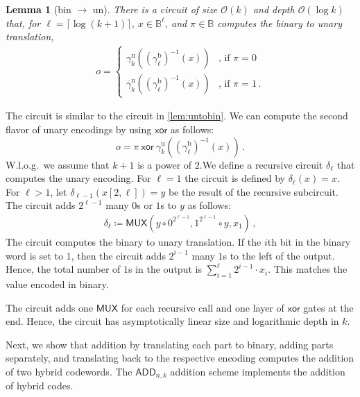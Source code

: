 \documentclass[9pt,journal,compsoc]{IEEEtran}
\newtheorem{lemma}[theorem]{Lemma}
\theoremstyle{remark}
\newcommand{\IB}{\mathbb{B}}
\newcommand{\XOR}{\textsf{xor}}
\newcommand{\MUX}{\textsf{MUX}}
\newcommand{\ceil}[1]{\lceil{#1}\rceil}
\newcommand{\gBin}[1]{\gamma_{#1}^{\operatorname{b}}}
\newcommand{\gUnary}[1]{\gamma_{#1}^{\operatorname{u}}}
\newcommand{\gbUnary}[1]{\overline{\gamma}_{#1}^{\operatorname{u}}}
\newcommand{\BLM}{{\textsf{ADD}}_{n,k}}
\newcommand{\BO}{\mathcal{O}}
\begin{document}
\begin{lemma}[bin $\rightarrow$ un]\label{lem:bintoun}
  There is a circuit of size $\BO(k)$ and depth $\BO(\log k)$ that, 
    for $\ell=\ceil{\log(k+1)}$, $x\in\IB^{\ell}$, and $\pi\in\IB$
    computes the binary to unary translation,
  \begin{align*}
    o =
    \begin{cases}
      \gUnary{k}((\gBin{\ell})^{-1}(x)) & \text{, if } \pi=0 \\
      \gbUnary{k}((\gBin{\ell})^{-1}(x)) & \text{, if } \pi=1\,.
    \end{cases}
  \end{align*}
\end{lemma}
\begin{IEEEproof}
  The circuit is similar to the circuit in \cref{lem:untobin}.
  We can compute the second flavor of unary encodings by
    using $\XOR$ as follows:
  \begin{equation*}
    o=\pi\ \XOR\ \gUnary{k}((\gBin{\ell})^{-1}(x))\,.
  \end{equation*}
  W.l.o.g.\ we assume that $k+1$ is a power of $2$.\footnotemark[9]
  We define a recursive circuit $\delta_\ell$
    that computes the unary encoding.
  For $\ell=1$ the circuit is defined by $\delta_\ell(x)=x$.
  For $\ell>1$, let $\delta_{\ell-1}(x[2,\ell])=y$ be the result of the recursive subcircuit.
  The circuit adds $2^{\ell-1}$ many $0$s or $1$s to $y$ as follows:
  \begin{align*}
    \delta_\ell\coloneqq
    \MUX(y \circ 0^{2^{\ell-1}} , 1^{2^{\ell-1}} \circ y,x_1)\,,
  \end{align*}
  The circuit computes the binary to unary translation.
  If the $i$th bit in the binary word is set to $1$, then 
    the circuit adds $2^{i-1}$ many $1$s to the left of the output.
  Hence, the total number of $1$s in the output is $\sum_{i=1}^\ell 2^{i-1}\cdot x_i$.
  This matches the value encoded in binary.

  The circuit adds one $\MUX$ for each recursive call and one layer of $\XOR$ gates
    at the end.
  Hence, the circuit has asymptotically linear size and logarithmic depth in $k$.
\end{IEEEproof}

Next, we show that addition by translating each part to binary,
  adding parts separately, and translating back to the 
  respective encoding computes the addition of two hybrid codewords.
The $\BLM$ addition scheme implements the addition of hybrid codes.
\end{document}
